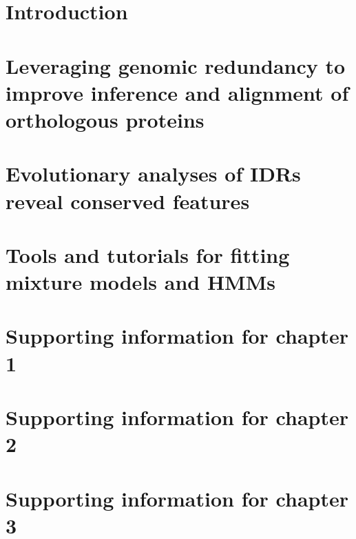 \documentclass[11pt,letterpaper,oneside]{book}
\renewcommand{\thefigure}{\thechapter.\arabic{figure}}
\newlength{\promptwidth}
\begin{document}
\tableofcontents
\clearpage  %
\setcounter{chapter}{-1}  %
\setcounter{page}{1}  %

\chapter{Introduction}
\graphicspath{{chapter0/figures/}}


\chapter{Leveraging genomic redundancy to improve inference and alignment of orthologous proteins}
\graphicspath{{chapter1/figures/}}


\chapter{Evolutionary analyses of IDRs reveal conserved features}


\chapter{Tools and tutorials for fitting mixture models and HMMs}
\graphicspath{{chapter3/}}



\printbibliography[heading=bibintoc]

\appendix
\setcounter{figure}{0}
\renewcommand{\thefigure}{\thechapter\arabic{figure}}
\setcounter{table}{0}
\renewcommand{\thetable}{\thechapter\arabic{table}}

\chapter{Supporting information for chapter 1}
\label{appendix:a}
\graphicspath{{chapter1/figures/}}


\chapter{Supporting information for chapter 2}
\label{appendix:b}
\graphicspath{{chapter2/figures/}}


\chapter{Supporting information for chapter 3}
\label{appendix:c}
\setlength{\promptwidth}{0in}  %

\end{document}
